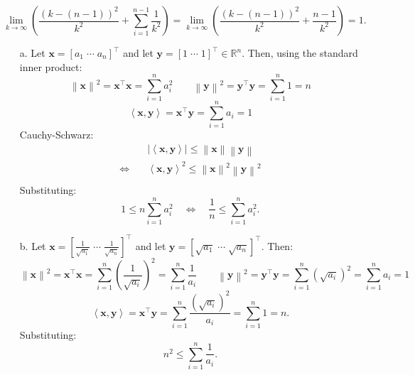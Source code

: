 \documentclass[11pt]{article}
\newcommand{\R}{\mathbb{R}}
\newcommand{\vect}[1]{\bm{#1}}      %
\newcommand{\x}{\vect{x}}           %
\newcommand{\y}{\vect{y}}           %
\newcommand{\abs}[1]{\left|#1\right|}                    %
\newcommand{\norm}[1]{\left\lVert#1\right\rVert}         %
\newcommand{\inner}[2]{\left\langle#1, #2\right\rangle}  %
\theoremstyle{definition}
\theoremstyle{plain}
\theoremstyle{remark}
\begin{document}
\begin{enumerate}
          \[
              \lim_{k \rightarrow \infty} \left( \frac{(k - (n - 1))^2}{k^2} + \sum_{i=1}^{n-1} \frac{1}{k^2} \right)
              = \lim_{k \rightarrow \infty} \left( \frac{(k - (n - 1))^2}{k^2} + \frac{n-1}{k^2} \right) = 1.
          \]

          \begin{enumerate}
              \item[a.] Let $\x = [ a_1 \; \cdots \; a_n ]^\top$ and let $\y = [ 1 \; \cdots \; 1 ]^\top \in \R^n$.
                    Then, using the standard inner product:
                    \[
                        \norm{\x}^2
                        = \x^\top \x
                        = \sum_{i = 1}^n a_i^2
                        \qquad
                        \norm{\y}^2
                        = \y^\top \y
                        = \sum_{i=1}^n 1 = n
                    \]
                    \[
                        \inner{\x}{\y}
                        = \x^\top \y
                        = \sum_{i=1}^n a_i = 1
                    \]
                    Cauchy-Schwarz:
                    \[
                        \begin{aligned}
                                       & \abs{\inner{\x}{\y}} \leq \norm{\x} \norm{\y} \\
                            \iff \quad & \inner{\x}{\y}^2 \leq \norm{\x}^2 \norm{\y}^2 \\
                        \end{aligned}
                    \]
                    Substituting:
                    \[
                        1 \leq n \sum_{i=1}^n a_i^2
                        \quad \iff \quad
                        \frac{1}{n} \leq \sum_{i=1}^n a_i^2.
                    \]

              \item[b.] Let $\x = \left [ \frac{1}{\sqrt{a_1}} \; \cdots \; \frac{1}{\sqrt{a_n}} \right ]^\top$ and let $\y = \left [ \sqrt{a_1} \; \cdots \; \sqrt{a_n} \right ]^\top$. Then:
                    \[
                        \norm{\x}^2
                        = \x^\top \x
                        = \sum_{i=1}^n \left ( \frac{1}{\sqrt{a_i}} \right )^2
                        = \sum_{i=1}^n \frac{1}{a_i}
                        \qquad
                        \norm{\y}^2
                        = \y^\top \y
                        = \sum_{i=1}^n \left ( \sqrt{a_i} \right )^2
                        = \sum_{i=1}^n a_i = 1
                    \]
                    \[
                        \inner{\x}{\y}
                        = \x^\top \y
                        = \sum_{i=1}^n \frac{\left ( \sqrt{a_i} \right )^2}{a_i} = \sum_{i=1}^n 1 = n.
                    \]
                    Substituting:
                    \[
                        n^2
                        \leq \sum_{i=1}^n \frac{1}{a_i}.
                    \]
          \end{enumerate}

\end{enumerate}
\end{document}
